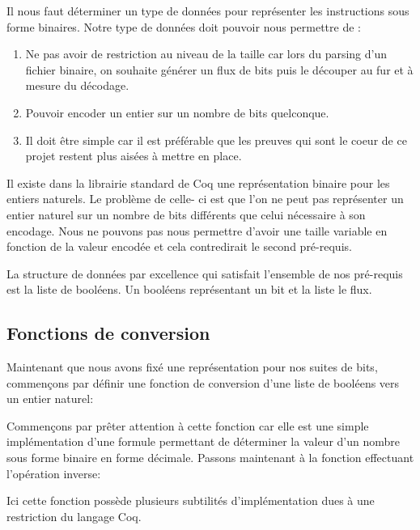 \documentclass {article}
\newcommand{\codefrom}[3]
           {}
\theoremstyle{definition}
\theoremstyle{remark}
\begin{document}
Il nous faut déterminer un type de données pour représenter
les instructions sous forme binaires.
Notre type de données doit pouvoir nous permettre de :
\begin{enumerate}
\item Ne pas avoir de restriction au niveau de la taille car lors du parsing d'un fichier binaire,
  on souhaite générer un flux de bits puis le découper au fur et à mesure du décodage.
\item Pouvoir encoder un entier sur un nombre de bits quelconque.
\item Il doit être simple car il est préférable que les preuves qui sont le coeur de ce projet restent
  plus aisées à mettre en place.
\end{enumerate}

Il existe dans la librairie standard de Coq une représentation binaire pour les entiers naturels.
Le problème de celle- ci est que l'on ne peut pas représenter un entier naturel sur un nombre de bits différents
que celui nécessaire à son encodage. Nous ne pouvons pas nous permettre d'avoir une taille variable en
fonction de la valeur encodée et cela contredirait le second pré-requis.

La structure de données par excellence qui satisfait l'ensemble de nos pré-requis est la liste de booléens.
Un booléens représentant un bit et la liste le flux.

\codefrom{src}{ast_instructions}{binary_instruction}




\subsection{Fonctions de conversion}
\label{Fonctions de conversion}
Maintenant que nous avons fixé une représentation pour nos suites de bits, commençons par définir
une fonction de conversion d'une liste de booléens vers un entier naturel:

\codefrom{src}{binary}{bitn}

Commençons par prêter attention à cette fonction car elle est une simple implémentation
d'une formule permettant de déterminer la valeur d'un nombre sous forme binaire
en forme décimale. Passons maintenant à la fonction effectuant l'opération inverse:

\codefrom{src}{binary}{nbit}


Ici cette fonction possède plusieurs subtilités d'implémentation dues
à une restriction du langage Coq.
\end{document}

